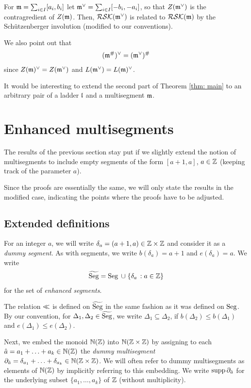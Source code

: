 \documentclass{ert-l} %
\begin{document}
\begin{remark} \label{rem: contra}
For $\mathfrak{m}=\sum_{i\in I}[a_i,b_i]$ let $\mathfrak{m}^\vee=\sum_{i\in I}[-b_i,-a_i]$,
so that $Z(\mathfrak{m}^\vee)$ is the contragredient of $Z(\mathfrak{m})$.
Then, $\mathcal{RSK}(\mathfrak{m}^\vee)$ is related to $\mathcal{RSK}(\mathfrak{m})$ by the Sch\"utzenberger involution
(modified to our conventions).

We also point out that
\[
(\mathfrak{m}^\#)^\vee=(\mathfrak{m}^\vee)^\#
\]
since $Z(\mathfrak{m})^\vee=Z(\mathfrak{m}^\vee)$ and $L(\mathfrak{m}^\vee)=L(\mathfrak{m})^\vee$.
\end{remark}


It would be interesting to extend the second part of Theorem \ref{thm: main} to an arbitrary
pair of a ladder $\mathfrak{l}$ and a multisegment $\mathfrak{m}$.

\section{Enhanced multisegments}
The results of the previous section stay put if we slightly extend the notion of multisegments to include empty segments of the form
$[a+1,a]$, $a\in\mathbb{Z}$ (keeping track of the parameter $a$).

Since the proofs are essentially the same, we will only state the results in the modified case, indicating the points where the proofs have to be adjusted.

\subsection{Extended definitions}
For an integer $a$, we will write $\delta_a = (a+1,a)\in \mathbb{Z}\times \mathbb{Z}$ and consider it as a \textit{dummy segment}.
As with segments, we write $b(\delta_a) = a+1$ and $e(\delta_a) = a$. We write
\[
\widetilde{\operatorname{Seg}} = \operatorname{Seg} \;\cup\; \{\delta_a\,: a\in \mathbb{Z}\}
\]
for the set of \textit{enhanced segments}.

The relation $\ll$ is defined on $\widetilde{\operatorname{Seg}}$ in the same fashion as it was defined on $\operatorname{Seg}$.
By our convention, for $\Delta_1,\Delta_2\in \widetilde{\operatorname{Seg}}$, we write $\Delta_1 \subseteq \Delta_2$, if $b(\Delta_2)\leq b(\Delta_1)$ and $e(\Delta_1)\leq e(\Delta_2)$.


Next, we embed the monoid $\mathbb{N}(\mathbb{Z})$ into $\mathbb{N}(\mathbb{Z}\times\mathbb{Z})$ by assigning to each $\hat{a} = a_1 + \ldots + a_k \in \mathbb{N}(\mathbb{Z})$ the \textit{dummy multisegment}
$\partial_{\hat{a}} = \delta_{a_1} + \ldots + \delta_{a_k} \in \mathbb{N}(\mathbb{Z}\times\mathbb{Z})$. We will often refer to dummy multisegments as elements of $\mathbb{N}(\mathbb{Z})$ by implicitly referring to this embedding.
We write $\operatorname{supp}\partial_{\hat{a}}$ for the underlying subset $\{a_1,\dots,a_k\}$ of $\mathbb{Z}$ (without multiplicity).
\end{document}
